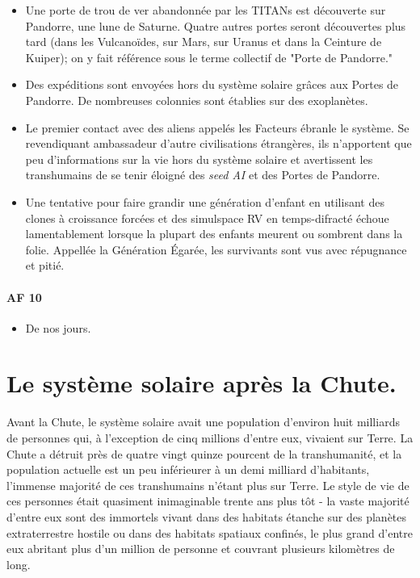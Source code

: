 \begin{itemize} 
   \item Une porte de trou de ver abandonnée par les TITANs est découverte sur
      Pandorre, une lune de Saturne. Quatre autres portes seront découvertes
      plus tard (dans les Vulcanoïdes, sur Mars, sur Uranus et dans la Ceinture
      de Kuiper); on y fait référence sous le terme collectif de "Porte de
      Pandorre." 
   \item Des expéditions sont envoyées hors du système solaire grâces aux
      Portes de Pandorre. De nombreuses colonnies sont établies sur des
      exoplanètes. 
   \item Le premier contact avec des aliens appelés les Facteurs ébranle le
      système. Se revendiquant ambassadeur d'autre civilisations étrangères,
      ils n'apportent que peu d'informations sur la vie hors du système solaire
      et avertissent les transhumains de se tenir éloigné des \textit{seed AI}
      et des Portes de Pandorre. 
   \item Une tentative pour faire grandir une génération d'enfant en utilisant
      des clones à croissance forcées et des simulspace RV en temps-difracté
      échoue lamentablement lorsque la plupart des enfants meurent ou sombrent
      dans la folie. Appellée la Génération Égarée, les survivants sont vus
      avec répugnance et pitié.
\end{itemize}

\paragraph{AF 10}

\begin{itemize} 
   \item De nos jours.
\end{itemize} 

\section{Le système solaire après la Chute.} \label{sec:solar-system-after} 

Avant la Chute, le système solaire avait une population d'environ huit milliards de personnes qui, à l'exception de cinq millions d'entre eux, vivaient sur Terre. La Chute a détruit près de quatre vingt quinze pourcent de la transhumanité, et la population actuelle est un peu inférieurer à un demi milliard d'habitants, l'immense majorité de ces transhumains n'étant plus sur Terre. Le style de vie de ces personnes était quasiment inimaginable trente ans plus tôt - la vaste majorité d'entre eux sont des immortels vivant dans des habitats étanche sur des planètes extraterrestre hostile ou dans des habitats spatiaux confinés, le plus grand d'entre eux abritant plus d'un million de personne et couvrant plusieurs kilomètres de long. 

